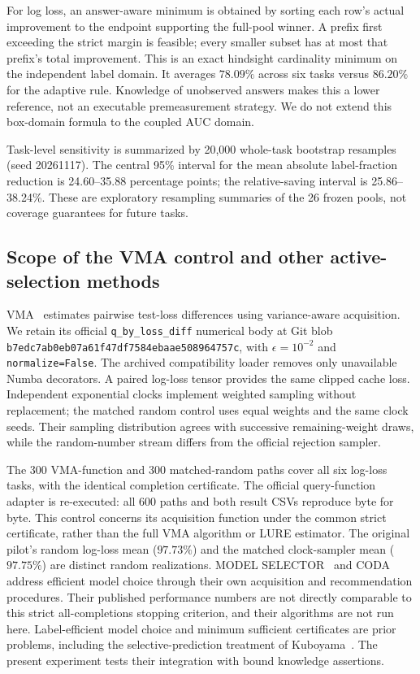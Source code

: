 For log loss, an answer-aware minimum is obtained by sorting each row's actual improvement to the endpoint supporting the full-pool winner. A prefix first exceeding the strict margin is feasible; every smaller subset has at most that prefix's total improvement. This is an exact hindsight cardinality minimum on the independent label domain. It averages $78.09\%$ across six tasks versus $86.20\%$ for the adaptive rule. Knowledge of unobserved answers makes this a lower reference, not an executable premeasurement strategy. We do not extend this box-domain formula to the coupled AUC domain.

Task-level sensitivity is summarized by 20,000 whole-task bootstrap resamples (seed 20261117). The central 95\% interval for the mean absolute label-fraction reduction is 24.60--35.88 percentage points; the relative-saving interval is 25.86--38.24\%. These are exploratory resampling summaries of the 26 frozen pools, not coverage guarantees for future tasks.

\FloatBarrier
\subsection{Scope of the VMA control and other active-selection methods}
VMA~\cite{hara2024vma} estimates pairwise test-loss differences using variance-aware acquisition. We retain its official \nolinkurl{q_by_loss_diff} numerical body at Git blob \nolinkurl{b7edc7ab0eb07a61f47df7584ebaae508964757c}, with $\epsilon=10^{-2}$ and \nolinkurl{normalize=False}. The archived compatibility loader removes only unavailable Numba decorators. A paired log-loss tensor provides the same clipped cache loss. Independent exponential clocks implement weighted sampling without replacement; the matched random control uses equal weights and the same clock seeds. Their sampling distribution agrees with successive remaining-weight draws, while the random-number stream differs from the official rejection sampler.

The 300 VMA-function and 300 matched-random paths cover all six log-loss tasks, with the identical completion certificate. The official query-function adapter is re-executed: all 600 paths and both result CSVs reproduce byte for byte. This control concerns its acquisition function under the common strict certificate, rather than the full VMA algorithm or LURE estimator. The original pilot's random log-loss mean ($97.73\%$) and the matched clock-sampler mean ($97.75\%$) are distinct random realizations. MODEL SELECTOR~\cite{okanovic2025selector} and CODA~\cite{kay2025coda} address efficient model choice through their own acquisition and recommendation procedures. Their published performance numbers are not directly comparable to this strict all-completions stopping criterion, and their algorithms are not run here. Label-efficient model choice and minimum sufficient certificates are prior problems, including the selective-prediction treatment of Kuboyama~\cite{kuboyama2026labels}. The present experiment tests their integration with bound knowledge assertions.


